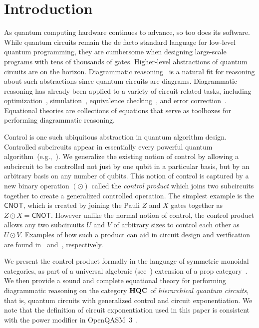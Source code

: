 \section{Introduction}

As quantum computing hardware continues to advance, so too does its software.
While quantum circuits remain the de facto standard language for low-level quantum programming, they are cumbersome when designing large-scale programs with tens of thousands of gates.
Higher-level abstractions of quantum circuits are on the horizon. 
Diagrammatic reasoning~\cite{Coecke2011} is a natural fit for reasoning about such abstractions since quantum circuits are diagrams. 
Diagrammatic reasoning has already been applied to a variety of circuit-related tasks, including optimization~\cite{Kissinger2020}, simulation~\cite{Sutcliffe2024,Sutcliffe2025}, equivalence checking~\cite{Peham2022}, and error correction~\cite{Khesin2025,Kissinger2024,Rodatz2024}.
Equational theories are collections of equations that serve as toolboxes for performing diagrammatic reasoning.

Control is one such ubiquitous abstraction in quantum algorithm design. Controlled subcircuits appear in essentially every powerful quantum algorithm~(e.g.,~\cite{Kitaev1995,Shor1997,Grover1996,Harrow2009}). 
We generalize the existing notion of control by allowing a subcircuit to be controlled not just by one qubit in a particular basis, but by an arbitrary basis on any number of qubits.
This notion of control is captured by a new binary operation $( \odot )$ called the \textit{control product} which joins two subcircuits together to create a generalized controlled operation.
The simplest example is the $\textsf{CNOT}$, which is created by joining the Pauli $Z$ and $X$ gates together as $Z \odot X = \textsf{CNOT}$.
However unlike the normal notion of control, the control product allows any two subcircuits $U$ and $V$ of arbitrary sizes to control each other as $U \odot V$.
Examples of how such a product can aid in circuit design and verification are found in~\cite{Gidney2017} and~\cite{Schober2024}, respectively.


We present the control product formally in the language of symmetric monoidal categories, as part of a universal algebraic (see~\cite{BaaderNipkow1998}) extension of a prop category~\cite{MacLane1965,Bergholm2011,Clement2023}. We then provide a sound and complete equational theory for performing diagrammatic reasoning on the category $\mathbf{HQC}$ of \emph{hierarchical quantum circuits}, that is, quantum circuits with generalized control and circuit exponentiation.
We note that the definition of circuit exponentiation used in this paper is consistent with the power modifier in OpenQASM~3~\cite{Cross2022}.


